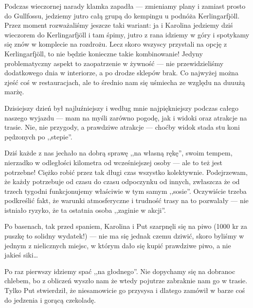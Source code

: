 Podczas wieczornej narady klamka zapadła --- zmieniamy plany i zamiast prosto do Gullfossu, jedziemy jutro całą grupą do kempingu u podnóża Kerlingarfjöll. Przez moment rozważaliśmy jeszcze taki wariant: ja i Karolina jedziemy dziś wieczorem do Kerlingarfjöll i tam śpimy, jutro z rana idziemy w góry i spotykamy się znów w komplecie na rozdrożu. Lecz skoro wszyscy przystali na opcję z Kerlingarfjöll, to nie będzie konieczne takie kombinowanie! Jedyny problematyczny aspekt to zaopatrzenie w żywność --- nie przewidzieliśmy dodatkowego dnia w interiorze, a po drodze sklepów brak. Co najwyżej można zjeść coś w restauracjach, ale to średnio nam się uśmiecha ze względu na duuużą marżę.

Dzisiejszy dzień był najluźniejszy i według mnie najpiękniejszy podczas całego naszego wyjazdu --- mam na myśli zarówno pogodę, jak i widoki oraz atrakcje na trasie. Nie, nie przygody, a prawdziwe atrakcje --- choćby widok stada stu koni pędzonych po ,,stepie''.

Dziś każde z nas jechało na dobrą sprawę ,,na własną rękę'', swoim tempem, nierzadko w odległości kilometra od wcześniejszej osoby --- ale to też jest potrzebne! Ciężko robić przez tak długi czas wszystko kolektywnie. Podejrzewam, że każdy potrzebuje od czasu do czasu odpoczynku od innych, zwłaszcza że od trzech tygodni funkcjonujemy właściwie w tym samym ,,sosie''. Oczywiście trzeba podkreślić fakt, że warunki atmosferyczne i trudność trasy na to pozwalały --- nie istniało ryzyko, że ta ostatnia osoba ,,zaginie w akcji''.

Po basenach, tak przed spaniem, Karolina i Put szarpnęli się na piwo (1000 kr za puszkę to solidny wydatek!) --- nie ma się jednak czemu dziwić, skoro byliśmy w jednym z nielicznych miejsc, w którym dało się kupić prawdziwe piwo, a nie jakieś siki…

Po raz pierwszy idziemy spać ,,na głodnego''. Nie dopychamy się na dobranoc chlebem, bo z obliczeń wyszło nam że wtedy pojutrze zabraknie nam go w trasie. Tylko Put stwierdził, że niesamowicie go przysysa i dlatego zamówił w barze coś do jedzenia i gorącą czekoladę.

